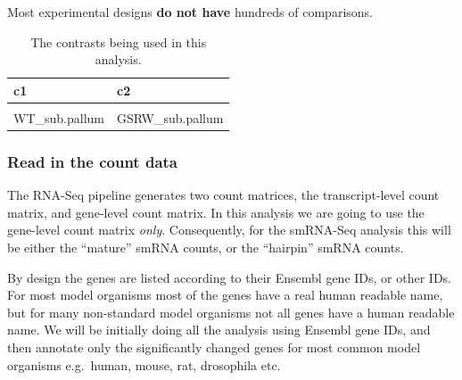 \documentclass[
  letterpaper,
  DIV=11,
  numbers=noendperiod]{scrartcl}
\newenvironment{Shaded}{\begin{snugshade}}{\end{snugshade}}
\newcommand{\AttributeTok}[1]{\textcolor[rgb]{0.40,0.45,0.13}{#1}}
\newcommand{\ConstantTok}[1]{\textcolor[rgb]{0.56,0.35,0.01}{#1}}
\newcommand{\FunctionTok}[1]{\textcolor[rgb]{0.28,0.35,0.67}{#1}}
\newcommand{\NormalTok}[1]{\textcolor[rgb]{0.00,0.23,0.31}{#1}}
\newcommand{\OtherTok}[1]{\textcolor[rgb]{0.00,0.23,0.31}{#1}}
\newcommand{\SpecialCharTok}[1]{\textcolor[rgb]{0.37,0.37,0.37}{#1}}
\newcommand{\StringTok}[1]{\textcolor[rgb]{0.13,0.47,0.30}{#1}}
\begin{document}
Most experimental designs \textbf{do not have} hundreds of comparisons.

\begin{Shaded}
\end{Shaded}

\hypertarget{tbl-contrasts}{}
\begin{table}
\caption{\label{tbl-contrasts}The contrasts being used in this analysis. }\tabularnewline

\centering
\begin{tabular}[t]{ll}
\toprule
c1 & c2\\
\midrule
\cellcolor{gray!6}{WT\_FOREBRAIN} & \cellcolor{gray!6}{GSRW\_FOREBRAIN}\\
WT\_sub.pallum & GSRW\_sub.pallum\\
\bottomrule
\end{tabular}
\end{table}

\hypertarget{read-in-the-count-data}{%
\subsubsection{Read in the count data}\label{read-in-the-count-data}}

The RNA-Seq pipeline generates two count matrices, the transcript-level
count matrix, and gene-level count matrix. In this analysis we are going
to use the gene-level count matrix \emph{only}. Consequently, for the
smRNA-Seq analysis this will be either the ``mature'' smRNA counts, or
the ``hairpin'' smRNA counts.

By design the genes are listed according to their Ensembl gene IDs, or
other IDs. For most model organisms most of the genes have a real human
readable name, but for many non-standard model organisms not all genes
have a human readable name. We will be initially doing all the analysis
using Ensembl gene IDs, and then annotate only the significantly changed
genes for most common model organisms e.g.~human, mouse, rat, drosophila
etc.
\end{document}

